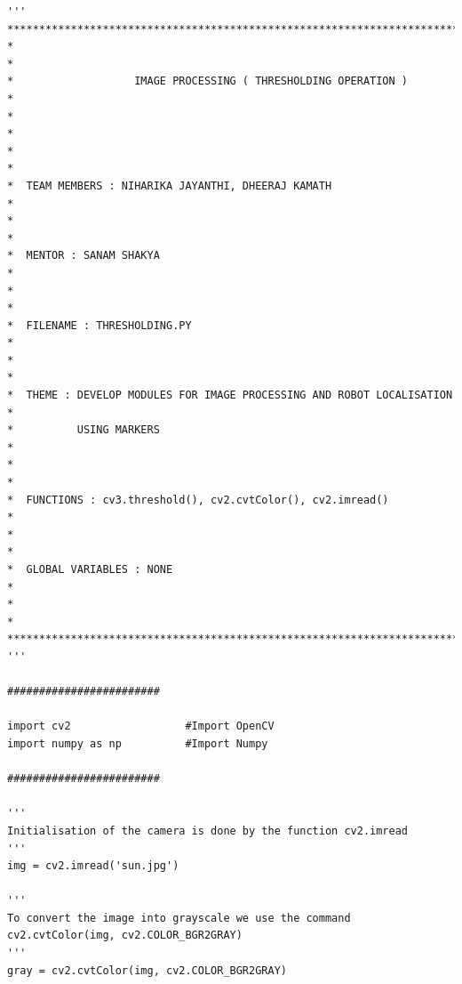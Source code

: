 \documentclass[]{article}
\begin{document}
\newpage
\begin{verbatim}
'''
**********************************************************************************
*                                                                                *
*                   IMAGE PROCESSING ( THRESHOLDING OPERATION )                  *
*                                                                                *
*                                                                                *
*  TEAM MEMBERS : NIHARIKA JAYANTHI, DHEERAJ KAMATH                              *
*                                                                                *
*  MENTOR : SANAM SHAKYA                                                         *
*                                                                                *
*  FILENAME : THRESHOLDING.PY                                                    *
*                                                                                *
*  THEME : DEVELOP MODULES FOR IMAGE PROCESSING AND ROBOT LOCALISATION           * 
*          USING MARKERS                                                         *
*                                                                                *
*  FUNCTIONS : cv3.threshold(), cv2.cvtColor(), cv2.imread()                     *
*                                                                                *
*  GLOBAL VARIABLES : NONE                                                       *
*                                                                                *
**********************************************************************************
'''

########################

import cv2                  #Import OpenCV
import numpy as np          #Import Numpy

########################

'''
Initialisation of the camera is done by the function cv2.imread
'''
img = cv2.imread('sun.jpg')

'''
To convert the image into grayscale we use the command
cv2.cvtColor(img, cv2.COLOR_BGR2GRAY)
'''
gray = cv2.cvtColor(img, cv2.COLOR_BGR2GRAY)


\end{verbatim}
\end{document}
